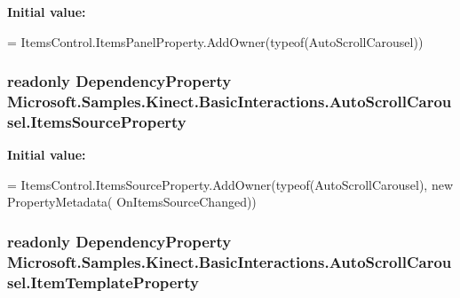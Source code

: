 {\bfseries Initial value\-:}
\begin{DoxyCode}
=
            ItemsControl.ItemsPanelProperty.AddOwner(typeof(AutoScrollCarousel))
\end{DoxyCode}
\hypertarget{class_microsoft_1_1_samples_1_1_kinect_1_1_basic_interactions_1_1_auto_scroll_carousel_ae087bb91dce35d44db28f715ad532c73}{
\subsubsection[{Items\-Source\-Property}]{\setlength{\rightskip}{0pt plus 5cm}readonly Dependency\-Property Microsoft.\-Samples.\-Kinect.\-Basic\-Interactions.\-Auto\-Scroll\-Carousel.\-Items\-Source\-Property\hspace{0.3cm}{\ttfamily [static]}}}\label{class_microsoft_1_1_samples_1_1_kinect_1_1_basic_interactions_1_1_auto_scroll_carousel_ae087bb91dce35d44db28f715ad532c73}
{\bfseries Initial value\-:}
\begin{DoxyCode}
=
            ItemsControl.ItemsSourceProperty.AddOwner(typeof(AutoScrollCarousel), \textcolor{keyword}{new} PropertyMetadata(
      OnItemsSourceChanged))
\end{DoxyCode}
\hypertarget{class_microsoft_1_1_samples_1_1_kinect_1_1_basic_interactions_1_1_auto_scroll_carousel_a4b1c8ea9f3319fa8b11bcb9d39722fad}{
\subsubsection[{Item\-Template\-Property}]{\setlength{\rightskip}{0pt plus 5cm}readonly Dependency\-Property Microsoft.\-Samples.\-Kinect.\-Basic\-Interactions.\-Auto\-Scroll\-Carousel.\-Item\-Template\-Property\hspace{0.3cm}{\ttfamily [static]}}}\label{class_microsoft_1_1_samples_1_1_kinect_1_1_basic_interactions_1_1_auto_scroll_carousel_a4b1c8ea9f3319fa8b11bcb9d39722fad}
